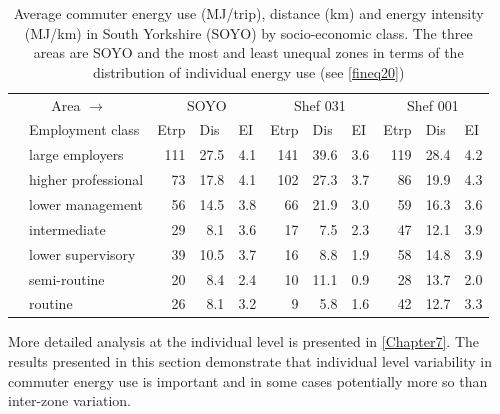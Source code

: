 \documentclass[a4paper, 11pt, twoside]{Thesis}
\begin{document}
\begin{table}[htbp]
\caption[Commuter energy use in South Yorkshire areas by class]
{Average commuter energy use (MJ/trip), distance (km) and energy intensity (MJ/km)
in South Yorkshire (SOYO) by socio-economic class.
The three areas are SOYO and the most and least
unequal zones in terms of the distribution of individual energy use (see
\cref{fineq20})}
\begin{tabular}{rl|rrr|rrr|rrr}
\toprule
\multicolumn{2}{c}{Area $\rightarrow$} &  \multicolumn{3}{|c|}{SOYO}  & \multicolumn{3}{c}{Shef 031} & \multicolumn{3}{|c}{Shef 001} \\
\multicolumn{1}{l}{} & Employment class & \multicolumn{1}{l}{Etrp} & \multicolumn{1}{l}{Dis} & \multicolumn{1}{l}{EI} & \multicolumn{1}{|l}{Etrp} & \multicolumn{1}{l}{Dis} & \multicolumn{1}{l}{EI} & \multicolumn{1}{|l}{Etrp} & \multicolumn{1}{l}{Dis} & \multicolumn{1}{l}{EI } \\
\midrule
 & large employers  & 111 & 27.5 & 4.1 & 141 & 39.6 & 3.6 & 119 & 28.4 & 4.2 \\
 & higher professional & 73 & 17.8 & 4.1 & 102 & 27.3 & 3.7 & 86 & 19.9 & 4.3 \\
 & lower management  & 56 & 14.5 & 3.8 & 66 & 21.9 & 3.0 & 59 & 16.3 & 3.6 \\
 & intermediate & 29 & 8.1 & 3.6 & 17 & 7.5 & 2.3 & 47 & 12.1 & 3.9 \\
 & lower supervisory  & 39 & 10.5 & 3.7 & 16 & 8.8 & 1.9 & 58 & 14.8 & 3.9 \\
 & semi-routine & 20 & 8.4 & 2.4 & 10 & 11.1 & 0.9 & 28 & 13.7 & 2.0 \\
 & routine & 26 & 8.1 & 3.2 & 9 & 5.8 & 1.6 & 42 & 12.7 & 3.3 \\
 \bottomrule
\end{tabular}
\label{tindenergy}
\end{table}

More detailed analysis at the individual
level is presented in \cref{Chapter7}. The results presented in this section
demonstrate that individual level variability in commuter energy use
is important and in some cases potentially more so than inter-zone variation.
\end{document}
